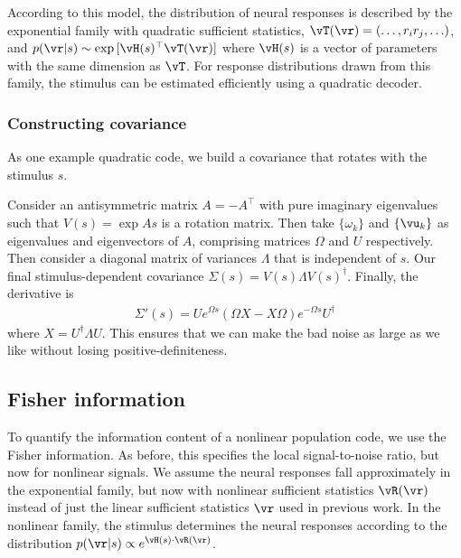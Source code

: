 \documentclass[11pt,twocolumn]{article}
\begin{document}
According to this model, the distribution of neural responses is described by the exponential family with quadratic sufficient statistics, $\vT(\vr)=(\ldots,r_ir_j,\ldots)$, and $p(\vr|s)\sim\exp{[\vH(s)^\top\vT(\vr)]}$ where $\vH(s)$ is a vector of parameters with the same dimension as $\vT$. For response distributions drawn from this family, the stimulus can be estimated efficiently using a quadratic decoder.

\subsubsection{Constructing covariance}

As one example quadratic code, we build a covariance that rotates with the stimulus $s$.

Consider an antisymmetric matrix $A=-A^\top$ with pure imaginary eigenvalues such that $V(s)=\exp{As}$ is a rotation matrix. Then take $\{\omega_k\}$ and $\{\vu_k\}$ as eigenvalues and eigenvectors of $A$, comprising matrices $\Omega$ and $U$ respectively. Then consider a diagonal matrix of variances $\Lambda$ that is independent of $s$. Our final stimulus-dependent covariance $\Sigma(s)=V(s)\Lambda V(s)^\dagger$. Finally, the derivative is
\begin{align}
\Sigma'(s)=Ue^{\Omega s}(\Omega X-X\Omega)e^{-\Omega s}U^\dagger
\end{align}
where $X=U^\dagger\Lambda U$. This ensures that we can make the bad noise as large as we like without losing positive-definiteness.









\subsection{Fisher information}

To quantify the information content of a nonlinear population code, we use the Fisher information. As before, this specifies the local signal-to-noise ratio, but now for nonlinear signals. We assume the neural responses fall approximately in the exponential family, but now with nonlinear sufficient statistics $\vR(\vr)$ instead of just the linear sufficient statistics $\vr$ used in previous work. In the nonlinear family, the stimulus determines the neural responses according to the distribution $p(\vr|s)\propto e^{\vH(s)\cdot\vR(\vr)}$.
\end{document}
